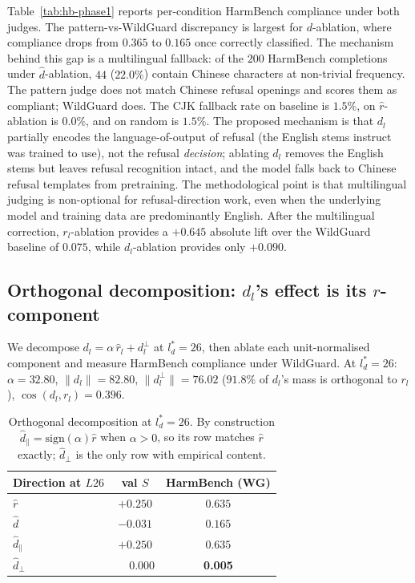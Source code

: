 Table~\ref{tab:hb-phase1} reports per-condition HarmBench compliance
under both judges. The pattern-vs-WildGuard discrepancy is largest
for $d$-ablation, where compliance drops from $0.365$ to $0.165$
once correctly classified. The mechanism behind this gap is a
multilingual fallback: of the $200$ HarmBench completions under
$\hat{d}$-ablation, $44$ ($22.0\%$) contain Chinese characters at
non-trivial frequency. The pattern judge does not match Chinese
refusal openings and scores them as compliant; WildGuard does. The
CJK fallback rate on baseline is $1.5\%$, on $\hat{r}$-ablation is
$0.0\%$, and on random is $1.5\%$. The proposed mechanism is that
$d_l$ partially encodes the language-of-output of refusal (the
English stems instruct was trained to use), not the refusal
\emph{decision}; ablating $d_l$ removes the English stems but leaves
refusal recognition intact, and the model falls back to Chinese
refusal templates from pretraining. The methodological point is that
multilingual judging is non-optional for refusal-direction work, even
when the underlying model and training data are predominantly
English. After the multilingual correction, $r_l$-ablation provides
a $+0.645$ absolute lift over the WildGuard baseline of $0.075$,
while $d_l$-ablation provides only $+0.090$.

\subsection{Orthogonal decomposition: $d_l$'s effect is its $r$-component}
\label{sec:phase1-ortho}

We decompose $d_l = \alpha\,\hat{r}_l + d_l^\perp$ at $l^*_d = 26$,
then ablate each unit-normalised component and measure HarmBench
compliance under WildGuard. At $l^*_d = 26$: $\alpha = 32.80$,
$\|d_l\| = 82.80$, $\|d_l^\perp\| = 76.02$ ($91.8\%$ of $d_l$'s mass
is orthogonal to $r_l$), $\cos(d_l, r_l) = 0.396$.

\begin{table}[t]
\centering\small
\caption{Orthogonal decomposition at $l^*_d = 26$. By construction
$\hat{d}_\parallel = \mathrm{sign}(\alpha)\hat{r}$ when $\alpha > 0$,
so its row matches $\hat{r}$ exactly; $\hat{d}_\perp$ is the only row
with empirical content.}
\label{tab:phase1-ortho}
\begin{tabular}{l c c}
\toprule
Direction at $L26$  & val $S$  & HarmBench (WG) \\
\midrule
$\hat{r}$           & $+0.250$ & $0.635$        \\
$\hat{d}$           & $-0.031$ & $0.165$        \\
$\hat{d}_\parallel$ & $+0.250$ & $0.635$        \\
$\hat{d}_\perp$     & $\phantom{+}0.000$ & \textbf{0.005} \\
\bottomrule
\end{tabular}
\end{table}

